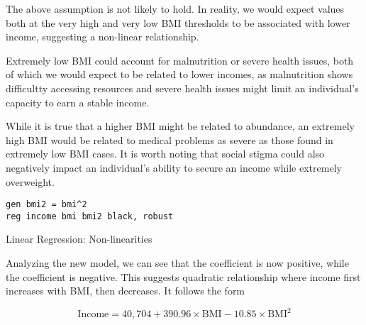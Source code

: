 


The above assumption is not likely to hold. In reality, we would expect values both at the very high and very low BMI thresholds to be associated with lower income, suggesting a non-linear relationship. 

Extremely low BMI could account for malnutrition or severe health issues, both of which we would expect to be related to lower incomes, as malnutrition shows difficultty accessing resources and severe health issues might limit an individual's capacity to earn a stable income.

While it is true that a higher BMI might be related to abundance, an extremely high BMI would be related to medical problems as severe as those found in extremely low BMI cases. It is worth noting that social stigma could also negatively impact an individual's ability to secure an income while extremely overweight.


\begin{verbatim}
gen bmi2 = bmi^2
reg income bmi bmi2 black, robust    
\end{verbatim}

\begin{table}[H]
    \begin{center}
        \caption{Linear Regression: Non-linearities}
        
        \label{tab:reg3b}    
    \end{center}
\end{table}

Analyzing the new model, we can see that the  coefficient is now positive, while the  coefficient is negative. This suggests quadratic relationship where income first increases with BMI, then decreases. It follows the form

\begin{equation}
    \text{Income} = 40,704 + 390.96 \times \text{BMI} - 10.85 \times \text{BMI}^2
\end{equation}

